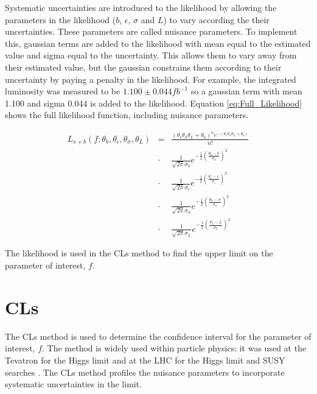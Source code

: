 Systematic uncertainties are introduced to the likelihood by allowing the 
parameters in the likelihood ($b$, $\epsilon$, $\sigma$ and $L$) to vary 
according the their uncertainties. These parameters are called nuisance 
parameters. To implement this, gaussian terms are added to the likelihood with 
mean equal to the estimated value and sigma equal to the uncertainty. This 
allows them to vary away from their estimated value, but the gaussian constrains 
them according to their uncertainty by paying a penalty in the likelihood. For 
example, the integrated luminosity was measured to be $1.100\pm0.044 
\unit{fb^{-1}}$ so a gaussian term with mean 1.100 and sigma 0.044 is added to 
the likelihood. Equation \ref{eq:Full_Likelihood} shows the full likelihood 
function, including nuisance parameters. 

\begin{eqnarray}
L_{s+b}(f; \theta_{b}, \theta_{\epsilon}, \theta_{\sigma}, \theta_{L}) &=&
\frac{(\theta_{\epsilon}\theta_{\sigma}\theta_{L}+\theta_{b})^{n}e^{-(\theta_{\epsilon}\theta_{\sigma}\theta_{L}+\theta_{b})}}{n!}
\nonumber \\
&\cdot&
\frac{1}{\sqrt{2\pi}\sigma_{b}}e^{-\frac{1}{2}\left(\frac{\theta_{b}-b}{\sigma_{b}}\right)^{2}}
\nonumber \\
&\cdot&
\frac{1}{\sqrt{2\pi}\sigma_{\epsilon}}e^{-\frac{1}{2}\left(\frac{\theta_{\epsilon}-\epsilon}{\sigma_{\epsilon}}\right)^{2}}
\nonumber \\
&\cdot&
\frac{1}{\sqrt{2\pi}\sigma_{\sigma}}e^{-\frac{1}{2}\left(\frac{\theta_{\sigma}-\sigma}{\sigma_{\sigma}}\right)^{2}}
\nonumber \\
&\cdot& 
\frac{1}{\sqrt{2\pi}\sigma_{L}}e^{-\frac{1}{2}\left(\frac{\theta_{L}-L}{\sigma_{L}}\right)^{2}} 
\label{eq:Full_Likelihood}
\end{eqnarray}

The likelihood is used in the CLs method to find the upper limit on the
parameter of interest, $f$.

\section{CLs}

The CLs method is used to determine the confidence interval for the parameter of
interest, $f$. The method is widely used within particle physics: it was used at
the Tevatron for the Higgs limit \cite{cls_tevatron} and at the LHC for the 
Higgs limit \cite{cls_lhc} and SUSY searches \cite{ra1}. The CLs method profiles
the nuisance parameters to incorporate systematic uncertainties in the limit. \\

